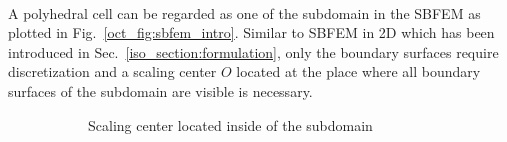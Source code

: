 \paragraph{}
A polyhedral cell can be regarded as one of the subdomain in the SBFEM as plotted in Fig.~\ref{oct_fig:sbfem_intro}.
Similar to SBFEM in 2D which has been introduced in Sec.~\ref{iso_section:formulation}, only the boundary surfaces require discretization and a scaling center $O$ located at the place where all boundary surfaces of the subdomain are visible is necessary.

\begin{figure}
    \centering
    \begin{subfigure}[b]{0.48\linewidth}
        \caption{Scaling center located inside of the subdomain}
        \label{oct_fig:sbfem_intro_a}
    \end{subfigure}
    \begin{subfigure}[b]{0.48\linewidth}
        \scalebox{0.5}{
}
\end{subfigure}
\end{figure}

